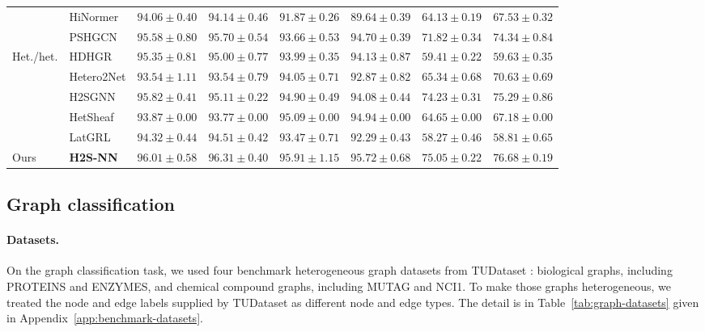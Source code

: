 \documentclass[sigconf,anonymous,review]{acmart}
\newcommand{\method}{\textsc{H2S-NN}}
\begin{document}
\begin{table}[t]
{\begin{tabular}{llcccccc}
    & HiNormer
    & $94.06 \pm 0.40$
    & $94.14 \pm 0.46$
    & $91.87 \pm 0.26$
    & $89.64 \pm 0.39$
    & $64.13 \pm 0.19$
    & $67.53 \pm 0.32$ \\

    & PSHGCN
    & $95.58 \pm 0.80$
    & $95.70 \pm 0.54$
    & $93.66 \pm 0.53$
    & $94.70 \pm 0.39$
    & $71.82 \pm 0.34$
    & $74.34 \pm 0.84$ \\
    \midrule

    \multirow{5}{*}{Het./het.}
    & HDHGR
    & $95.35 \pm 0.81$
    & $95.00 \pm 0.77$
    & $93.99 \pm 0.35$
    & $94.13 \pm 0.87$
    & $59.41 \pm 0.22$
    & $59.63 \pm 0.35$ \\

    & Hetero2Net
    & $93.54 \pm 1.11$
    & $93.54 \pm 0.79$
    & $94.05 \pm 0.71$
    & $92.87 \pm 0.82$
    & $65.34 \pm 0.68$
    & $70.63 \pm 0.69$ \\

    & H2SGNN
    & $95.82 \pm 0.41$
    & $95.11 \pm 0.22$
    & $94.90 \pm 0.49$
    & $94.08 \pm 0.44$
    & $74.23 \pm 0.31$
    & $75.29 \pm 0.86$ \\

    & HetSheaf
    & $93.87 \pm 0.00$
    & $93.77 \pm 0.00$
    & $95.09 \pm 0.00$
    & $94.94 \pm 0.00$
    & $64.65 \pm 0.00$
    & $67.18 \pm 0.00$ \\

    & LatGRL
    & $94.32 \pm 0.44$
    & $94.51 \pm 0.42$
    & $93.47 \pm 0.71$
    & $92.29 \pm 0.43$
    & $58.27 \pm 0.46$
    & $58.81 \pm 0.65$ \\
    \midrule

    Ours
    & \textbf{\method{}}
    & $\mathbf{96.01 \pm 0.58}$
    & $\mathbf{96.31 \pm 0.40}$
    & $\mathbf{95.91 \pm 1.15}$
    & $\mathbf{95.72 \pm 0.68}$
    & $\mathbf{75.05 \pm 0.22}$
    & $\mathbf{76.68 \pm 0.19}$ \\
    \bottomrule
  \end{tabular}%
  }
\end{table}



\subsection{Graph classification}
\label{sec:setup-graph}
\paragraph{Datasets.}
On the graph classification task, we used four benchmark heterogeneous graph datasets from TUDataset \cite{morris2020tudataset}: biological graphs, including PROTEINS and ENZYMES, and chemical compound graphs, including MUTAG and NCI1. To make those graphs heterogeneous, we treated the node and edge labels supplied by TUDataset as different node and edge types. The detail is  in Table~\ref{tab:graph-datasets} given in Appendix~\ref{app:benchmark-datasets}.
\end{document}
